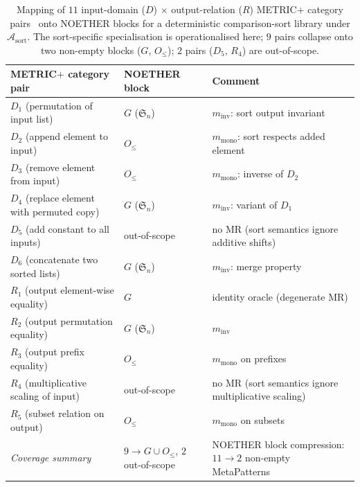 \documentclass[acmsmall, screen]{acmart}
\begin{document}
\begin{table}[h]
\centering
\caption{Mapping of $11$ input-domain ($D$) $\times$ output-relation ($R$) METRIC$+$ category pairs~\cite{ChenMETRIC2016, SunMETRICplus2021} onto NOETHER blocks for a deterministic comparison-sort library under $\mathcal{A}_{\mathrm{sort}}$. The sort-specific specialisation is operationalised here; $9$ pairs collapse onto two non-empty blocks ($G$, $O_{\le}$); $2$ pairs ($D_5$, $R_4$) are out-of-scope.}
\label{tab:metricplus-sorting}
\small
\begin{tabular}{lll}
\toprule
METRIC$+$ category pair & NOETHER block & Comment \\
\midrule
$D_1$ (permutation of input list) & $G$ ($\mathfrak{S}_n$) & $m_{\mathrm{inv}}$: sort output invariant \\
$D_2$ (append element to input) & $O_{\le}$ & $m_{\mathrm{mono}}$: sort respects added element \\
$D_3$ (remove element from input) & $O_{\le}$ & $m_{\mathrm{mono}}$: inverse of $D_2$ \\
$D_4$ (replace element with permuted copy) & $G$ ($\mathfrak{S}_n$) & $m_{\mathrm{inv}}$: variant of $D_1$ \\
$D_5$ (add constant to all inputs) & out-of-scope & no MR (sort semantics ignore additive shifts) \\
$D_6$ (concatenate two sorted lists) & $G$ ($\mathfrak{S}_n$) & $m_{\mathrm{inv}}$: merge property \\
$R_1$ (output element-wise equality) & $G$ & identity oracle (degenerate MR) \\
$R_2$ (output permutation equality) & $G$ ($\mathfrak{S}_n$) & $m_{\mathrm{inv}}$ \\
$R_3$ (output prefix equality) & $O_{\le}$ & $m_{\mathrm{mono}}$ on prefixes \\
$R_4$ (multiplicative scaling of input) & out-of-scope & no MR (sort semantics ignore multiplicative scaling) \\
$R_5$ (subset relation on output) & $O_{\le}$ & $m_{\mathrm{mono}}$ on subsets \\
\midrule
\textit{Coverage summary} & $9 \to G \cup O_{\le}$, $2$ out-of-scope & NOETHER block compression: $11 \to 2$ non-empty MetaPatterns \\
\bottomrule
\end{tabular}
\end{table}
\end{document}
